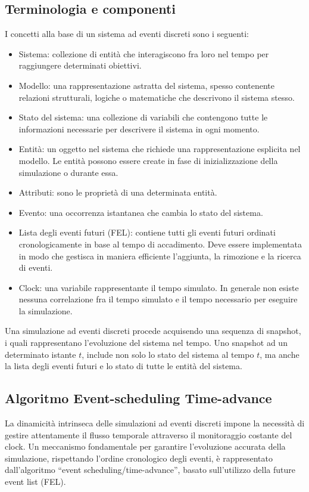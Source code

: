 \documentclass[12pt,a4paper,openright,twoside]{book}
\begin{document}
\subsection{Terminologia e componenti}
I concetti alla base di un sistema ad eventi discreti sono i seguenti: 
\begin{itemize}
    \item Sistema: collezione di entità che interagiscono fra loro nel tempo per raggiungere determinati obiettivi.
    \item Modello: una rappresentazione astratta del sistema, spesso contenente relazioni strutturali, logiche o matematiche che descrivono il sistema stesso.
    \item Stato del sistema: una collezione di variabili che contengono tutte le informazioni necessarie per descrivere il sistema in ogni momento.
    \item Entità: un oggetto nel sistema che richiede una rappresentazione esplicita nel modello. Le entità possono essere create in fase di inizializzazione della simulazione o durante essa. 
    \item Attributi: sono le proprietà di una determinata entità.
    \item Evento: una occorrenza istantanea che cambia lo stato del sistema. 
    \item Lista degli eventi futuri (FEL): contiene tutti gli eventi futuri ordinati cronologicamente in base al tempo di accadimento. Deve essere implementata in modo che gestisca in maniera efficiente l'aggiunta, la rimozione e la ricerca di eventi. 
    \item Clock: una variabile rappresentante il tempo simulato. In generale non esiste nessuna correlazione fra il tempo simulato e il tempo necessario per eseguire la simulazione. 
\end{itemize}
Una simulazione ad eventi discreti procede acquisendo una sequenza di snapshot, i quali rappresentano l'evoluzione del sistema nel tempo. Uno snapshot ad un determinato istante $t$, include non solo lo stato del sistema al tempo $t$, ma anche la lista degli eventi futuri e lo stato di tutte le entità del sistema.

\subsection{Algoritmo Event-scheduling Time-advance}
La dinamicità intrinseca delle simulazioni ad eventi discreti impone la necessità di gestire attentamente il flusso temporale attraverso il monitoraggio costante del clock. 
Un meccanismo fondamentale per garantire l'evoluzione accurata della simulazione, rispettando l'ordine cronologico degli eventi, è rappresentato dall'algoritmo ``event scheduling/time-advance'', basato sull'utilizzo della future event list (FEL).
\end{document}
